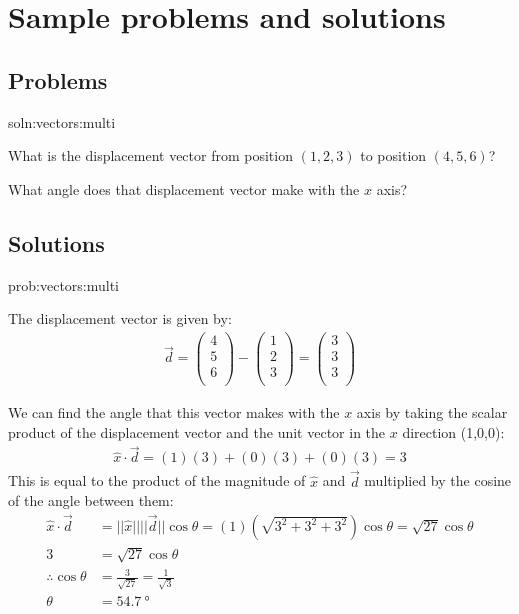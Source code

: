 \section{Sample problems and solutions}
\subsection{Problems} 
\begin{problemParts}{soln:vectors:multi}{\label{prob:vectors:multi}}{
\item What is the displacement vector from position $(1,2,3)$ to position $(4,5,6)$?
\item What angle does that displacement vector make with the $x$ axis?
}
\end{problemParts}


\newpage
\subsection{Solutions}

\begin{solutionParts}{prob:vectors:multi}{\label{soln:vectors:multi}
\item The displacement vector is given by:
\begin{align*}
\vec d = \begin{pmatrix}
           4\\
           5\\
           6\\
         \end{pmatrix} - \begin{pmatrix}
           1\\
           2\\
           3\\
         \end{pmatrix}=\begin{pmatrix}
           3\\
           3\\
           3\\
         \end{pmatrix}
\end{align*}
\item We can find the angle that this vector makes with the $x$ axis by taking the scalar product of the displacement vector and the unit vector in the $x$ direction (1,0,0):
\begin{align*}
\hat x \cdot \vec d = (1)(3)+(0)(3)+(0)(3) = 3
\end{align*}
This is equal to the product of the magnitude of $\hat x $ and $\vec d$ multiplied by the cosine of the angle between them:
\begin{align*}
\hat x \cdot \vec d  &= ||\hat x||||\vec d||\cos\theta = (1)(\sqrt{3^2+3^2+3^2})\cos\theta= \sqrt{27}\cos\theta\\
 3 &= \sqrt{27}\cos\theta\\
 \therefore \cos\theta &= \frac{3}{\sqrt{27}} = \frac{1}{\sqrt{3}}\\
 \theta&=\SI{54.7}{\degree}
\end{align*}
}
\end{solutionParts}

